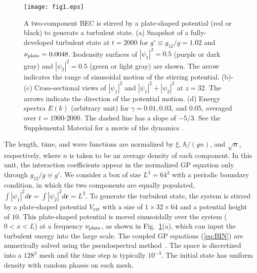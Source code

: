 \documentclass[pra,aps,superscriptaddress,twocolumn]{revtex4-2}
\begin{document}
\begin{figure}[t]
	\texttt{[image: fig1.eps]}
 	\caption{
    A two-component BEC is stirred by a plate-shaped potential (red or black)
    to generate a turbulent state.
		(a) Snapshot of a fully-developed turbulent state at $t = 2000$ for
    $g' \equiv g_{12} / g = 1.02$ and $\nu_{\rm plate} = 0.0048$.
		Isodensity surfaces of $|\psi_1|^2 = 0.5$ (purple or dark gray) and
    $|\psi_2|^2 = 0.5$ (green or light gray) are shown.
    The arrow indicates the range of sinusoidal motion of the stirring
    potential.
		(b)-(c) Cross-sectional views of $|\psi_1|^2$ and $|\psi_1|^2 +
    |\psi_2|^2$ at $z=32$.
    The arrows indicate the direction of the potential motion.
		(d) Energy spectra $E(k)$ (arbitrary unit) for $\gamma = 0.01, 0.03$, and
    $0.05$, averaged over $t = 1900$-$2000$.
		The dashed line has a slope of $-5/3$.
		See the Supplemental Material for a movie of the dynamics~\cite{SM}.
	}
	\label{f:setup}
\end{figure}
The length, time, and wave functions are normalized by $\xi$, $\hbar /
(gn)$, and $\sqrt{n}$, respectively, where $n$ is taken to be an average
density of each component.
In this unit, the interaction coefficients appear in the normalized GP
equation only through $g_{12} / g \equiv g'$.
We consider a box of size $L^3=64^3$ with a periodic boundary condition, in
which the two components are equally populated, $\int |\psi_1|^2 d\bm{r} =
\int |\psi_2|^2 d\bm{r} = L^3$.
To generate the turbulent state, the system is stirred by a plate-shaped
potential $V_{\textrm{ext}}$ with a size of $1 \times 32 \times 64$ and a
potential height of $10$.
This plate-shaped potential is moved sinusoidally over the system ($0 < x <
L$) at a frequency $\nu_{\rm plate}$, as shown in Fig.~\ref{f:setup}(a),
which can input the turbulent energy into the large scale.
The coupled GP equations (\ref{eq:BIN}) are numerically solved using the
pseudospectral method~\cite{Recipe}.
The space is discretized into a $128^3$ mesh and the time step is typically
$10^{-3}$.
The initial state has uniform density with random phases on each mesh.
\end{document}
